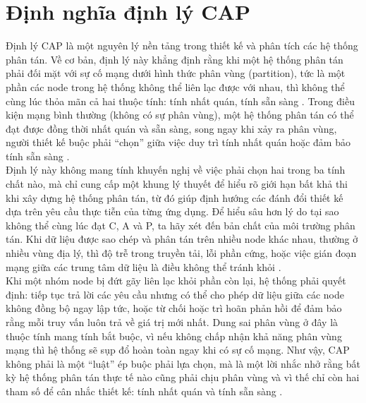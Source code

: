 \documentclass[conference]{IEEEtran}
\begin{document}
\section{Định nghĩa định lý CAP}
Định lý CAP là một nguyên lý nền tảng trong thiết kế và phân tích các hệ thống phân tán. Về cơ bản, định lý này khẳng định rằng khi một hệ thống phân tán phải đối mặt với sự cố mạng dưới hình thức phân vùng (partition), tức là một phần các node trong hệ thống không thể liên lạc được với nhau, thì không thể cùng lúc thỏa mãn cả hai thuộc tính: tính nhất quán, tính sẵn sàng \cite{gilbert}. Trong điều kiện mạng bình thường (không có sự phân vùng), một hệ thống phân tán có thể đạt được đồng thời nhất quán và sẵn sàng, song ngay khi xảy ra phân vùng, người thiết kế buộc phải “chọn” giữa việc duy trì tính nhất quán hoặc đảm bảo tính sẵn sàng \cite{ozsu-2019}.\\
Định lý này không mang tính khuyến nghị về việc phải chọn hai trong ba tính chất nào, mà chỉ cung cấp một khung lý thuyết để hiểu rõ giới hạn bất khả thi khi xây dựng hệ thống phân tán, từ đó giúp định hướng các đánh đổi thiết kế dựa trên yêu cầu thực tiễn của từng ứng dụng. Để hiểu sâu hơn lý do tại sao không thể cùng lúc đạt C, A và P, ta hãy xét đến bản chất của môi trường phân tán. Khi dữ liệu được sao chép và phân tán trên nhiều node khác nhau, thường ở nhiều vùng địa lý, thì độ trễ trong truyền tải, lỗi phần cứng, hoặc việc gián đoạn mạng giữa các trung tâm dữ liệu là điều không thể tránh khỏi \cite{gilbert}.\\
Khi một nhóm node bị đứt gãy liên lạc khỏi phần còn lại, hệ thống phải quyết định: tiếp tục trả lời các yêu cầu nhưng có thể cho phép dữ liệu giữa các node không đồng bộ ngay lập tức, hoặc từ chối hoặc trì hoãn phản hồi để đảm bảo rằng mỗi truy vấn luôn trả về giá trị mới nhất. Dung sai phân vùng ở đây là thuộc tính mang tính bắt buộc, vì nếu không chấp nhận khả năng phân vùng mạng thì hệ thống sẽ sụp đổ hoàn toàn ngay khi có sự cố mạng. Như vậy, CAP không phải là một “luật” ép buộc phải lựa chọn, mà là một lời nhắc nhở rằng bất kỳ hệ thống phân tán thực tế nào cũng phải chịu phân vùng và vì thế chỉ còn hai tham số để cân nhắc thiết kế: tính nhất quán và tính sẵn sàng \cite{ozsu-2019}.
\end{document}
